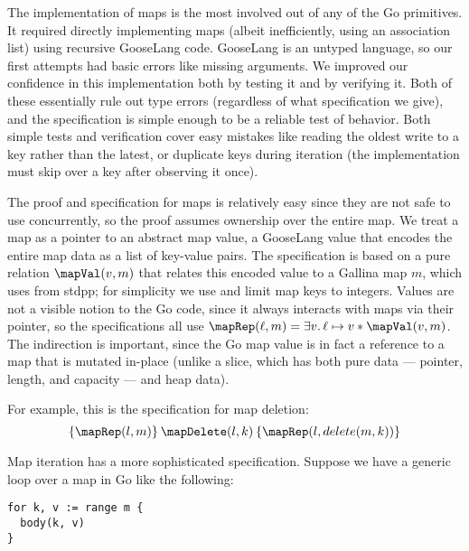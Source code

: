 The implementation of maps is the most involved out of any of the Go
primitives. It required directly implementing maps (albeit
inefficiently, using an association list) using recursive GooseLang
code. GooseLang is an untyped language, so our first attempts had basic
errors like missing arguments. We improved our confidence in this
implementation both by testing it and by verifying it. Both of these
essentially rule out type errors (regardless of what specification we give),
and the specification is simple enough
to be a reliable test of behavior. Both simple tests and verification
cover easy mistakes like reading the oldest write to a key rather than
the latest, or duplicate keys during iteration (the implementation must
skip over a key after observing it once).

The proof and specification for maps is relatively easy since they are
not safe to use concurrently, so the proof assumes ownership over the entire map. We
treat a map as a pointer to an abstract map value, a GooseLang value
that encodes the entire map data as a list of key-value pairs. The
specification is based on a pure relation $\mapVal(v, m)$ that relates
this encoded value to a Gallina map $m$, which uses  from
stdpp; for simplicity we use  and limit map
keys to integers. Values are not a visible notion to the Go code, since
it always interacts with maps via their pointer, so the specifications
all use $\mapRep(\ell, m) = \exists v.\, \ell \mapsto v * \mapVal(v, m)$. The
indirection is important, since the Go map value
 is in fact a reference to a map that is
mutated in-place (unlike a slice, which has both pure data --- pointer,
length, and capacity --- and heap data).

For example, this is the specification for map deletion:
\[
\hoare{\mapRep(l, m)}{\mapDelete(l, k)}{\mapRep(l, delete(m, k))}
\]

Map iteration has a more sophisticated specification. Suppose we have a generic loop
over a map in Go like the following:

\begin{verbatim}
for k, v := range m {
  body(k, v)
}
\end{verbatim}

